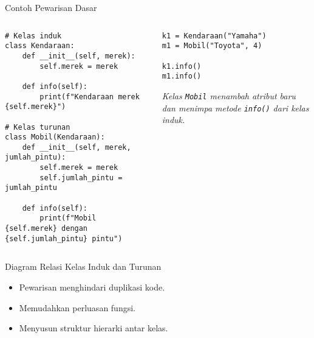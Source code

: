 \documentclass[aspectratio=169, table]{beamer}
\begin{document}
\begin{frame}[fragile]{Contoh Pewarisan Dasar}
\vspace{20pt}
\begin{columns}[T]
\begin{column}{0.65\textwidth}
\begin{lstlisting}[style=PythonStyle]
# Kelas induk
class Kendaraan:
    def __init__(self, merek):
        self.merek = merek

    def info(self):
        print(f"Kendaraan merek {self.merek}")

# Kelas turunan
class Mobil(Kendaraan):
    def __init__(self, merek, jumlah_pintu):
        self.merek = merek
        self.jumlah_pintu = jumlah_pintu

    def info(self):
        print(f"Mobil {self.merek} dengan {self.jumlah_pintu} pintu")
\end{lstlisting}
\end{column}

\begin{column}{0.3\textwidth}
\begin{lstlisting}[style=PythonStyle]
k1 = Kendaraan("Yamaha")
m1 = Mobil("Toyota", 4)

k1.info()
m1.info()
\end{lstlisting}

\textit{Kelas \texttt{Mobil} menambah atribut baru 
dan menimpa metode \texttt{info()} dari kelas induk.}
\end{column}
\end{columns}
\end{frame}


\begin{frame}[fragile]{Diagram Relasi Kelas Induk dan Turunan}
\vspace{20pt}
\begin{center}
\end{center}
\begin{itemize}
    \item Pewarisan menghindari duplikasi kode.
    \item Memudahkan perluasan fungsi.
    \item Menyusun struktur hierarki antar kelas.
\end{itemize}
\end{frame}
\end{document}
